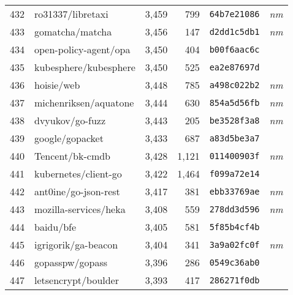 {\begin{supertabular}{llrrll}
        432 &                  ro31337/libretaxi &  3,459 &    799 &  \texttt{64b7e21086} &  \textit{nm} \\
        433 &                    gomatcha/matcha &  3,456 &    147 &  \texttt{d2dd1c5db1} &  \textit{nm} \\
        434 &              open-policy-agent/opa &  3,450 &    404 &  \texttt{b00f6aac6c} &              \\
        435 &              kubesphere/kubesphere &  3,450 &    525 &  \texttt{ea2e87697d} &              \\
        436 &                         hoisie/web &  3,448 &    785 &  \texttt{a498c022b2} &  \textit{nm} \\
        437 &              michenriksen/aquatone &  3,444 &    630 &  \texttt{854a5d56fb} &  \textit{nm} \\
        438 &                    dvyukov/go-fuzz &  3,443 &    205 &  \texttt{be3528f3a8} &  \textit{nm} \\
        439 &                    google/gopacket &  3,433 &    687 &  \texttt{a83d5be3a7} &              \\
        440 &                    Tencent/bk-cmdb &  3,428 &  1,121 &  \texttt{011400903f} &  \textit{nm} \\
        441 &               kubernetes/client-go &  3,422 &  1,464 &  \texttt{f099a72e14} &              \\
        442 &               ant0ine/go-json-rest &  3,417 &    381 &  \texttt{ebb33769ae} &  \textit{nm} \\
        443 &              mozilla-services/heka &  3,408 &    559 &  \texttt{278dd3d596} &  \textit{nm} \\
        444 &                          baidu/bfe &  3,405 &    581 &  \texttt{5f85b4cf4b} &              \\
        445 &                igrigorik/ga-beacon &  3,404 &    341 &  \texttt{3a9a02fc0f} &  \textit{nm} \\
        446 &                    gopasspw/gopass &  3,396 &    286 &  \texttt{0549c36ab0} &              \\
        447 &                letsencrypt/boulder &  3,393 &    417 &  \texttt{286271f0db} &              \\

\end{supertabular}}

